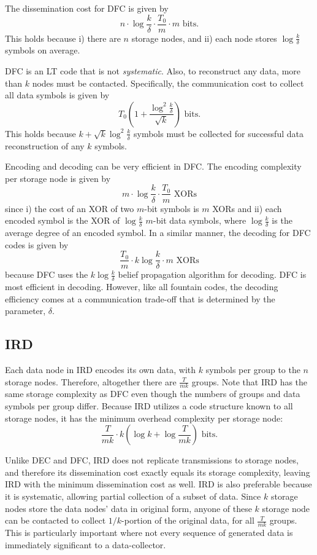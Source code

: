 \documentclass[10pt,journal,letterpaper,compsoc]{IEEEtran}
\newcommand{\0}{{\bf 0}}
\begin{document}
The dissemination cost for DFC is given by
$$n\cdot\log\frac{k}{\delta}\cdot\frac{T_0}{m}\cdot m\text{ bits.}$$ This holds because i) there are $n$ storage nodes,
and ii) each node stores $\log\frac{k}{\delta}$ symbols on average.

DFC is an LT code that is not \emph{systematic}. Also, to reconstruct any data, more than $k$ nodes must be contacted. Specifically, the communication cost to collect all data symbols is given by
$$T_0\left(1+\frac{\log^2\frac{k}{\delta}} {\sqrt k}\right)\text{ bits.}$$ This holds because $k+\sqrt k\log^2\frac{k}{\delta}$ symbols must be collected for successful data reconstruction of any $k$ symbols. 

Encoding and decoding can be very efficient in DFC. The encoding complexity per storage node is given by
$$m\cdot\log\frac{k}{\delta}\cdot\frac{T_0}{m}\text{ XORs}$$ since i) the cost of an XOR of two $m$-bit symbols is $m$ XORs and
ii) each encoded symbol is the XOR of $\log\frac{k}{\delta}$ $m$-bit data symbols, where $\log\frac{k}{\delta}$ is the average degree of an encoded symbol.
In a similar manner, the decoding for DFC codes is given by
$$\frac{T_0}{m}\cdot k\log\frac{k}{\delta}\cdot m\text{ XORs}$$ because DFC uses the $k\log\frac{k}{\delta}$ belief propagation algorithm for decoding.
DFC is most efficient in decoding. However, like all fountain codes, the decoding efficiency comes at a communication trade-off that is determined by the parameter, $\delta$.

\subsection{IRD}
Each data  node in IRD encodes its own data, with $k$ symbols per group to the $n$ storage nodes. Therefore, altogether there are 
$\frac{T}{mk}$ groups. Note that IRD has the same storage complexity as DFC even though the numbers of groups and data symbols per group differ. Because IRD utilizes a code structure known to all storage nodes, it has the minimum overhead complexity per storage node:
$$\frac{T}{mk}\cdot k\left(\log k + \log\frac{T}{mk}\right)\text{ bits.}$$

Unlike DEC and DFC, IRD does not replicate transmissions to storage nodes, and therefore its dissemination cost exactly equals its storage complexity, leaving IRD with the minimum dissemination cost as well.  
IRD is also preferable because it is systematic, allowing partial collection of a subset of data. Since $k$ storage nodes store the data nodes' data in original form, anyone of these $k$ storage node can be contacted to collect $1/k$-portion of the original data, for all $\frac{T}{mk}$ groups. This is particularly important where not every sequence of generated data is immediately significant to a data-collector.
\end{document}
